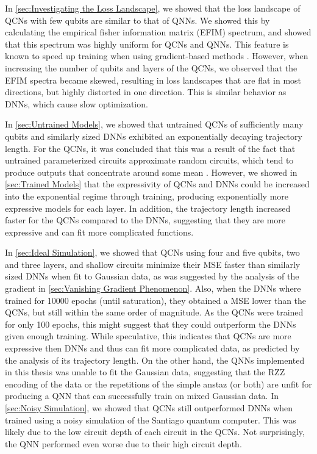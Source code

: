 In \autoref{sec:Investigating the Loss Landscape}, we showed that the loss landscape of QCNs with few qubits are similar to that of QNNs. We showed this by calculating the empirical fisher information matrix (EFIM) spectrum, and showed that this spectrum was highly uniform for QCNs and QNNs. This feature is known to speed up training when using gradient-based methods \citet{karakida2019universal}. However, when increasing the number of qubits and layers of the QCNs, we observed that the EFIM spectra became skewed, resulting in loss landscapes that are flat in most directions, but highly distorted in one direction. This is similar behavior as DNNs, which cause slow optimization.

In \autoref{sec:Untrained Models}, we showed that untrained QCNs of sufficiently many qubits and similarly sized DNNs exhibited an exponentially decaying trajectory length. For the QCNs, it was concluded that this was a result of the fact that untrained parameterized circuits approximate random circuits, which tend to produce outputs that concentrate around some mean \cite{McClean_2018}. However, we showed in \autoref{sec:Trained Models} that the expressivity of QCNs and DNNs could be increased into the exponential regime through training, producing exponentially more expressive models for each layer. In addition, the trajectory length increased faster for the QCNs compared to the DNNs, suggesting that they are more expressive and can fit more complicated functions.

In \autoref{sec:Ideal Simulation}, we showed that QCNs using four and five qubits, two and three layers, and shallow circuits minimize their MSE faster than similarly sized DNNs when fit to Gaussian data, as was suggested by the analysis of the gradient in \autoref{sec:Vanishing Gradient Phenomenon}. Also, when the DNNs where trained for 10000 epochs (until saturation), they obtained a MSE lower than the QCNs, but still within the same order of magnitude. As the QCNs were trained for only 100 epochs, this might suggest that they could outperform the DNNs given enough training. While speculative, this indicates that QCNs are more expressive then DNNs and thus can fit more complicated data, as predicted by the analysis of its trajectory length. On the other hand, the QNNs implemented in this thesis was unable to fit the Gaussian data, suggesting that the RZZ encoding of the data or the repetitions of the simple anstaz (or both) are unfit for producing a QNN that can successfully train on mixed Gaussian data. In \autoref{sec:Noisy Simulation}, we showed that QCNs still outperformed DNNs when trained using a noisy simulation of the Santiago quantum computer. This was likely due to the low circuit depth of each circuit in the QCNs. Not surprisingly, the QNN performed even worse due to their high circuit depth.   

